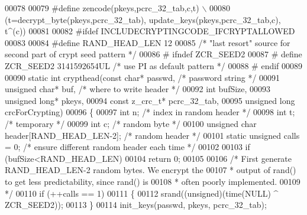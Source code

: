 \begin{DoxyCode}
00078 
00079 \textcolor{preprocessor}{#define zencode(pkeys,pcrc\_32\_tab,c,t) \(\backslash\)}
00080 \textcolor{preprocessor}{    (t=decrypt\_byte(pkeys,pcrc\_32\_tab), update\_keys(pkeys,pcrc\_32\_tab,c), t^(c))}
00081 
00082 \textcolor{preprocessor}{#ifdef INCLUDECRYPTINGCODE\_IFCRYPTALLOWED}
00083 
00084 \textcolor{preprocessor}{#define RAND\_HEAD\_LEN  12}
00085    \textcolor{comment}{/* "last resort" source for second part of crypt seed pattern */}
00086 \textcolor{preprocessor}{#  ifndef ZCR\_SEED2}
00087 \textcolor{preprocessor}{#    define ZCR\_SEED2 3141592654UL     }\textcolor{comment}{/* use PI as default pattern */}\textcolor{preprocessor}{}
00088 \textcolor{preprocessor}{#  endif}
00089 
00090 \textcolor{keyword}{static} \textcolor{keywordtype}{int} crypthead(\textcolor{keyword}{const} \textcolor{keywordtype}{char}* passwd,      \textcolor{comment}{/* password string */}
00091                      \textcolor{keywordtype}{unsigned} \textcolor{keywordtype}{char}* buf,      \textcolor{comment}{/* where to write header */}
00092                      \textcolor{keywordtype}{int} bufSize,
00093                      \textcolor{keywordtype}{unsigned} \textcolor{keywordtype}{long}* pkeys,
00094                      \textcolor{keyword}{const} z\_crc\_t* pcrc\_32\_tab,
00095                      \textcolor{keywordtype}{unsigned} \textcolor{keywordtype}{long} crcForCrypting)
00096 \{
00097     \textcolor{keywordtype}{int} n;                       \textcolor{comment}{/* index in random header */}
00098     \textcolor{keywordtype}{int} t;                       \textcolor{comment}{/* temporary */}
00099     \textcolor{keywordtype}{int} c;                       \textcolor{comment}{/* random byte */}
00100     \textcolor{keywordtype}{unsigned} \textcolor{keywordtype}{char} header[RAND\_HEAD\_LEN-2]; \textcolor{comment}{/* random header */}
00101     \textcolor{keyword}{static} \textcolor{keywordtype}{unsigned} calls = 0;   \textcolor{comment}{/* ensure different random header each time */}
00102 
00103     \textcolor{keywordflow}{if} (bufSize<RAND\_HEAD\_LEN)
00104       \textcolor{keywordflow}{return} 0;
00105 
00106     \textcolor{comment}{/* First generate RAND\_HEAD\_LEN-2 random bytes. We encrypt the}
00107 \textcolor{comment}{     * output of rand() to get less predictability, since rand() is}
00108 \textcolor{comment}{     * often poorly implemented.}
00109 \textcolor{comment}{     */}
00110     \textcolor{keywordflow}{if} (++calls == 1)
00111     \{
00112         srand((\textcolor{keywordtype}{unsigned})(time(NULL) ^ ZCR\_SEED2));
00113     \}
00114     init\_keys(passwd, pkeys, pcrc\_32\_tab);

\end{DoxyCode}
